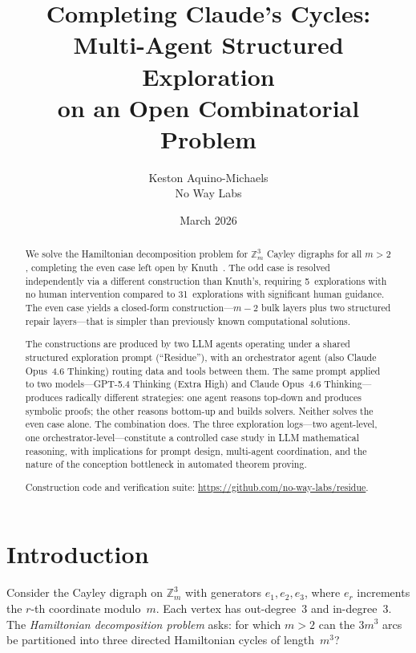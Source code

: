 \documentclass[11pt]{article}
\title{\textbf{Completing Claude's Cycles:\\Multi-Agent Structured Exploration\\on an Open Combinatorial Problem}}
\author{%
Keston Aquino-Michaels\\
No Way Labs
}
\date{March 2026}
\theoremstyle{definition}
\theoremstyle{remark}
\newcommand{\Zm}{\mathbb{Z}_m}
\begin{document}
\maketitle

\begin{abstract}
We solve the Hamiltonian decomposition problem for $\Zm^3$ Cayley digraphs for all $m > 2$, completing the even case left open by Knuth~\cite{knuth2026}. The odd case is resolved independently via a different construction than Knuth's, requiring 5~explorations with no human intervention compared to 31~explorations with significant human guidance. The even case yields a closed-form construction---$m-2$ bulk layers plus two structured repair layers---that is simpler than previously known computational solutions.

The constructions are produced by two LLM agents operating under a shared structured exploration prompt (``Residue''), with an orchestrator agent (also Claude Opus~4.6 Thinking) routing data and tools between them. The same prompt applied to two models---GPT-5.4 Thinking (Extra High) and Claude Opus~4.6 Thinking---produces radically different strategies: one agent reasons top-down and produces symbolic proofs; the other reasons bottom-up and builds solvers. Neither solves the even case alone. The combination does. The three exploration logs---two agent-level, one orchestrator-level---constitute a controlled case study in LLM mathematical reasoning, with implications for prompt design, multi-agent coordination, and the nature of the conception bottleneck in automated theorem proving.

Construction code and verification suite: \url{https://github.com/no-way-labs/residue}.
\end{abstract}

\section{Introduction}
\label{sec:intro}

Consider the Cayley digraph on $\Zm^3$ with generators $e_1, e_2, e_3$, where $e_r$ increments the $r$-th coordinate modulo~$m$. Each vertex has out-degree~3 and in-degree~3. The \emph{Hamiltonian decomposition problem} asks: for which $m > 2$ can the $3m^3$ arcs be partitioned into three directed Hamiltonian cycles of length~$m^3$?
\end{document}
